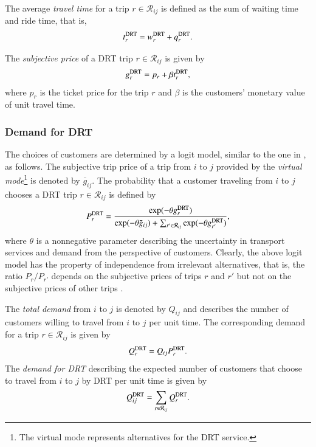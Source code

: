 \documentclass[dissertation,draft*]{aaltoseries}
\begin{document}
The average \emph{travel time} for a trip $r \in \mathcal{R}_{ij}$ is defined as
the sum of waiting time and ride time, that is, 
\begin{align}
\label{traveltime}
t_{r}^{\rm DRT} = w_{r}^{\rm DRT} + q_{r}^{\rm DRT}.
\end{align}

The \emph{subjective price} of a DRT trip $r \in \mathcal{R}_{ij}$ is given by
\begin{align}
\label{asiakashinta}
g_{r}^{\rm DRT} = p_{r} + \beta t_{r}^{\rm DRT},
\end{align}
where $p_{r}$ is the ticket price for the trip $r$ and $\beta$ is the customers' 
monetary value of unit travel time. 

\subsubsection{Demand for DRT}
The choices of customers are determined by a logit model, similar to the one in \citep{yang2010}, as follows.
The subjective trip price of a trip from $i$ to $j$ provided by the \emph{virtual mode}\footnote{The virtual mode 
represents alternatives for the DRT service.} is denoted by $\bar{g}_{ij}$.
The probability that a customer traveling from $i$ to $j$ chooses a DRT trip $r \in \mathcal{R}_{ij}$ is defined by
\begin{align}
\label{kysyntatn}
P_{r}^{\rm DRT} = 
\frac{\exp(-\theta g_{r}^{\rm DRT})}{\exp(-\theta \bar{g}_{ij}) + \sum_{r' \in \mathcal{R}_{ij}}\exp(-\theta g_{r'}^{\rm DRT})},
\end{align}
where $\theta$ is a nonnegative parameter describing the uncertainty in transport services and demand
from the perspective of customers.  
Clearly, the above logit model has the property of independence from irrelevant alternatives, that is, 
the ratio $P_{r}/P_{r'}$ depends on the subjective prices of trips $r$ and $r'$ but
not on the subjective prices of other trips \citep{small2007}.
 

The \emph{total demand} from $i$ to $j$ is denoted by $Q_{ij}$ and describes
the number of customers willing to travel from $i$ to $j$ per unit time.
The corresponding demand for a trip $r \in \mathcal{R}_{ij}$ is given by
\begin{align}
\label{matkakysynta}
Q_{r}^{\rm DRT} = Q_{ij} P_{r}^{\rm DRT}.
\end{align}
The \emph{demand for DRT} describing the expected number of customers that 
choose to travel from $i$ to $j$ by DRT per unit time is given by
\begin{align}
\label{drtkysynta}
Q_{ij}^{\rm DRT} = \sum_{r\in \mathcal{R}_{ij}} Q_{r}^{\rm DRT}.
\end{align}
\end{document}
